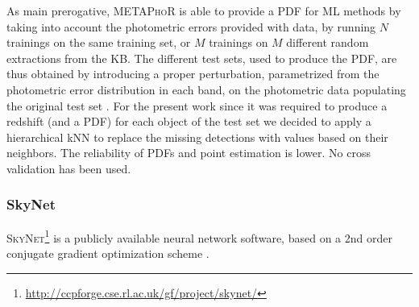 

As main prerogative, \textsc{METAPhoR} is able to provide a PDF for ML methods by taking into account the photometric errors provided with data, by running $N$ trainings on the same training set, or $M$ trainings on $M$ different random extractions from the KB. The different test sets, used to produce the PDF, are thus obtained by introducing a proper perturbation, parametrized from the photometric error distribution in each band, on the photometric data populating the original test set \citep{Brescia:18}.  For the present work since it was required to produce a redshift (and a PDF) for each object of the test set we decided to apply a hierarchical kNN to replace the missing detections with values based on their neighbors.  The reliability of PDFs and point estimation is lower. No cross validation has been used.


\subsubsection{SkyNet}
\label{sec:skynet}

\textsc{SkyNet}\footnote{\url{http://ccpforge.cse.rl.ac.uk/gf/project/skynet/}} \citep{Graff:14} is a publicly available neural network software, based on a 2nd order conjugate gradient optimization scheme \citep[see][for further details]{Graff:14}. %

